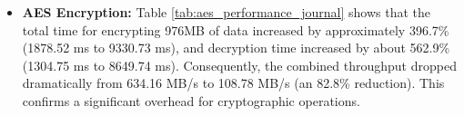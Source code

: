 \begin{itemize}
    \item \textbf{AES Encryption:} Table \ref{tab:aes_performance_journal} shows that the total time for encrypting 976MB of data increased by approximately 396.7\% (1878.52 ms to 9330.73 ms), and decryption time increased by about 562.9\% (1304.75 ms to 8649.74 ms). Consequently, the combined throughput dropped dramatically from 634.16 MB/s to 108.78 MB/s (an 82.8\% reduction). This confirms a significant overhead for cryptographic operations.
          \begin{table}[!t]
              \centering
              \caption{AES-256-CBC Performance Results (976MB Data)}
              \label{tab:aes_performance_journal}
          \end{table}

\end{itemize}

